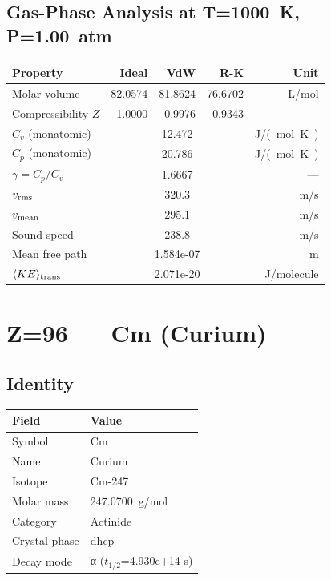 \documentclass[11pt,a4paper]{article}
\begin{document}
\subsection{Gas-Phase Analysis at T=\SI{1000}{K}, P=\SI{1.00}{atm}}
\begin{tabular}{lrrrr}
  \toprule
  Property & Ideal & VdW & R-K & Unit \\
  \midrule
  Molar volume & 82.0574 & 81.8624 & 76.6702 & \si{L/mol} \\
  Compressibility $Z$ & 1.0000 & 0.9976 & 0.9343 & --- \\
  \midrule
  $C_v$ (monatomic) & \multicolumn{3}{c}{12.472} & \si{J/(mol.K)} \\
  $C_p$ (monatomic) & \multicolumn{3}{c}{20.786} & \si{J/(mol.K)} \\
  $\gamma = C_p/C_v$ & \multicolumn{3}{c}{1.6667} & --- \\
  $v_{\rm rms}$ & \multicolumn{3}{c}{320.3} & \si{m/s} \\
  $v_{\rm mean}$ & \multicolumn{3}{c}{295.1} & \si{m/s} \\
  Sound speed & \multicolumn{3}{c}{238.8} & \si{m/s} \\
  Mean free path & \multicolumn{3}{c}{1.584e-07} & \si{m} \\
  $\langle KE \rangle_{\rm trans}$ & \multicolumn{3}{c}{2.071e-20} & \si{J/molecule} \\
  \bottomrule
\end{tabular}

\newpage

\section{Z=96 --- Cm (Curium)}
\label{sec:Z96}

\subsection{Identity}
\begin{tabular}{ll}
  \toprule
  Field & Value \\
  \midrule
  Symbol & Cm \\
  Name & Curium \\
  Isotope & Cm-247 \\
  Molar mass & \SI{247.0700}{g/mol} \\
  Category & Actinide \\
  Crystal phase & dhcp \\
  Decay mode & α ($t_{1/2}$=4.930e+14 s) \\
  \bottomrule
\end{tabular}
\end{document}
